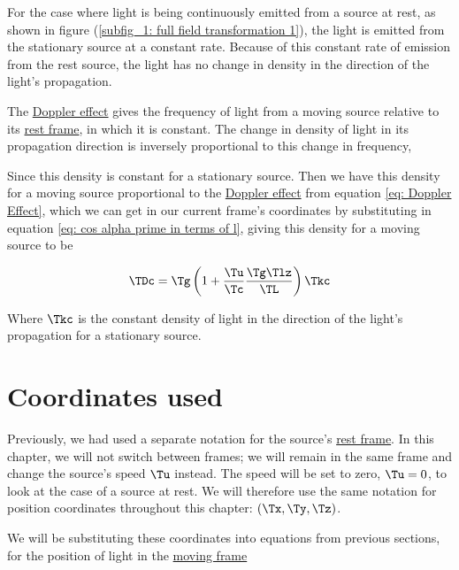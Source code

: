 For the case where light is being continuously emitted from a source at rest, as shown in figure (\ref{subfig_1: full field transformation 1}), the light is emitted from the stationary source at a constant rate.
Because of this constant rate of emission from the rest source, the light has no change in density in the direction of the light's propagation.

The \hyperlink{def-doppler-effect}{Doppler effect} gives the frequency of light from a moving source relative to its \hyperlink{def-proper-frame}{rest frame}, in which it is constant.
The change in density of light in its propagation direction is inversely proportional to this change in frequency,

Since this density is constant for a stationary source.
Then we have this density for a moving source proportional to the \hyperlink{def-doppler-effect}{Doppler effect} from equation \eqref{eq: Doppler Effect}, which we can get in our current frame's coordinates by substituting in equation \eqref{eq: cos alpha prime in terms of l}, giving this density for a moving source to be

\begin{equation}
	\label{eq: denisty of light parallel to propagation}
	\TDc  = {\Tg }\left(1 + \dfrac{\Tu }{\Tc }\frac{\Tg  \Tlz }{\TL }\right) \Tkc
\end{equation}

Where $\Tkc $ is the constant density of light in the direction of the light's propagation for a stationary source.


\section{Coordinates used}\label{sect: Coordinates used}

Previously, we had used a separate notation for the source's \hyperlink{def-proper-frame}{rest frame}.
In this chapter, we will not switch between frames; we will remain in the same frame and change the source's speed $\Tu $ instead.
The speed will be set to zero, $\Tu =0$, to look at the case of a source at rest.
We will therefore use the same notation for position coordinates throughout this chapter: $(\Tx ,\Ty ,\Tz )$.

We will be substituting these coordinates into equations from previous sections, for the position of light in the \hyperlink{def-Moving-Frame}{moving frame}

